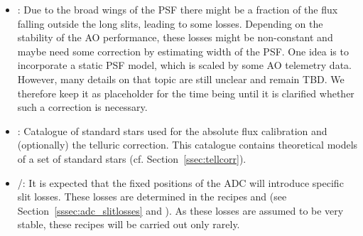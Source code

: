 \begin{itemize}
    \item \hyperref[dataitem:ao_psf_model]{}: Due to the broad wings of the \ac{PSF} there might be a fraction of the flux falling outside the long slits, leading to some losses. Depending on the stability of the \ac{AO} performance, these losses might be non-constant and maybe need some correction by estimating width of the \ac{PSF}. One idea is to incorporate a static \ac{PSF} model, which is scaled by some \ac{AO} telemetry data. However, many details on that topic are still unclear and remain TBD. We therefore keep it as placeholder for the time being until it is clarified whether such a correction is necessary.
    \item \hyperref[dataitem:ref_std_cat]{}: Catalogue of standard stars used for the absolute flux calibration and (optionally) the telluric correction. This catalogue contains theoretical models of a set of standard stars (cf. Section~\ref{ssec:tellcorr}). 
    \item \hyperref[dataitem:lm_adc_slitloss]{}/\hyperref[dataitem:n_adc_slitloss]{}: It is expected that the fixed positions of the \ac{ADC} will introduce specific slit losses. These losses are determined in the recipes \hyperref[rec:metis_lm_adc_slitloss]{} and \hyperref[rec:metis_n_adc_slitloss]{} (see Section~\ref{sssec:adc_slitlosses} and \cite{METIS-calibration_plan}). As these losses are assumed to be very stable, these recipes will be carried out only rarely.

\end{itemize}
